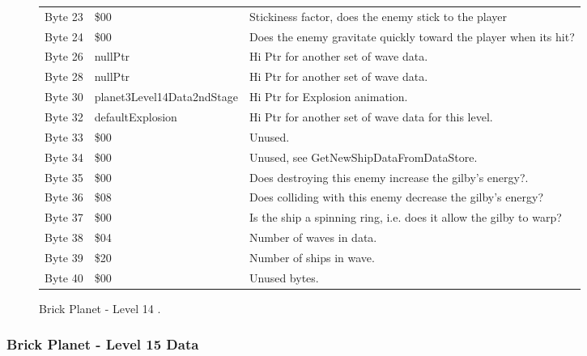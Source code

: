 \begin{figure}[H]
{\begin{adjustbox}{width=12cm}
\begin{tabular}{lll}
 Byte 23 & \$00                        & Stickiness factor, does the enemy stick to the player              \\
 Byte 24 & \$00                        & Does the enemy gravitate quickly toward the player when its hit?   \\
 Byte 26 & nullPtr                    & Hi Ptr for another set of wave data.                               \\
 Byte 28 & nullPtr                    & Hi Ptr for another set of wave data.                               \\
 Byte 30 & planet3Level14Data2ndStage & Hi Ptr for Explosion animation.                                    \\
 Byte 32 & defaultExplosion           & Hi Ptr for another set of wave data for this level.                \\
 Byte 33 & \$00                        & Unused.                                                            \\
 Byte 34 & \$00                        & Unused, see GetNewShipDataFromDataStore.                           \\
 Byte 35 & \$00                        & Does destroying this enemy increase the gilby's energy?.           \\
 Byte 36 & \$08                        & Does colliding with this enemy decrease the gilby's energy?        \\
 Byte 37 & \$00                        & Is the ship a spinning ring, i.e. does it allow the gilby to warp? \\
 Byte 38 & \$04                        & Number of waves in data.                                           \\
 Byte 39 & \$20                        & Number of ships in wave.                                           \\
 Byte 40 & \$00                        & Unused bytes.                                                      \\
\bottomrule
\end{tabular}

  \end{adjustbox}

  }\caption*{Brick Planet - Level 14
.}
\end{figure}

\clearpage
\subsubsection{Brick Planet - Level 15 Data}

